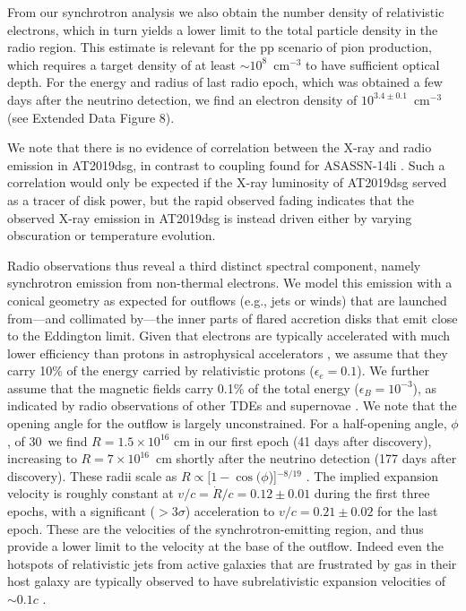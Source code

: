 From our synchrotron analysis we also obtain the number density of relativistic electrons, which in  turn yields a lower limit to the total particle density in the radio region. This estimate is relevant for the pp scenario of pion production, which requires a target density of at least $\sim 10^8$~cm$^{-3}$ to have sufficient optical depth. For the energy and radius of last radio epoch, which was obtained a few days after the neutrino detection, we find an electron density of $10^{3.4\pm 0.1}$~cm$^{-3}$ (see Extended Data Figure 8).

We note that there is no evidence of correlation between the X-ray and radio emission in AT2019dsg, in contrast to coupling found for ASASSN-14li . Such a correlation would only be expected if the X-ray luminosity of AT2019dsg served as a tracer of disk power, but the rapid observed fading indicates that the observed X-ray emission in AT2019dsg is instead driven either by varying obscuration or temperature evolution. 

Radio observations thus reveal a third distinct spectral component, namely synchrotron emission from non-thermal electrons. We model this emission with a  conical geometry as expected for outflows (e.g., jets or winds) that are launched from---and collimated by---the inner parts of flared accretion disks that emit close to the Eddington limit.
Given that electrons are typically accelerated with much lower efficiency than protons in astrophysical accelerators , we assume that they carry 10\% of the energy carried by relativistic protons ($\epsilon_{e} = 0.1$). We further assume that the magnetic fields carry 0.1\% of the total energy ($\epsilon_{B} = 10^{-3}$), as indicated by radio observations of other TDEs  and supernovae . We note that the opening angle for the outflow is largely unconstrained. For a half-opening angle, $\phi$, of 30\arcdeg\ we find $R = 1.5 \times 10^{16}$ cm in our first epoch (41 days after discovery), increasing to $R = 7 \times 10^{16}$~cm shortly after the neutrino detection (177 days after discovery). These radii scale  as $R \propto [1-\cos(\phi$)]$^{-8/19}$ . The implied expansion velocity is roughly constant at $v/c = \dot{R}/c = 0.12 \pm 0.01 $ during the first three epochs, with a significant ($>3\sigma$) acceleration to $v/c = 0.21 \pm0.02$ for the last epoch. These are the velocities of the synchrotron-emitting region, and thus provide a lower limit to the velocity at the base of the outflow.  Indeed even the hotspots of relativistic jets from active galaxies that are frustrated by gas in their host galaxy are typically observed to have subrelativistic expansion velocities of $\sim0.1c$ . 

